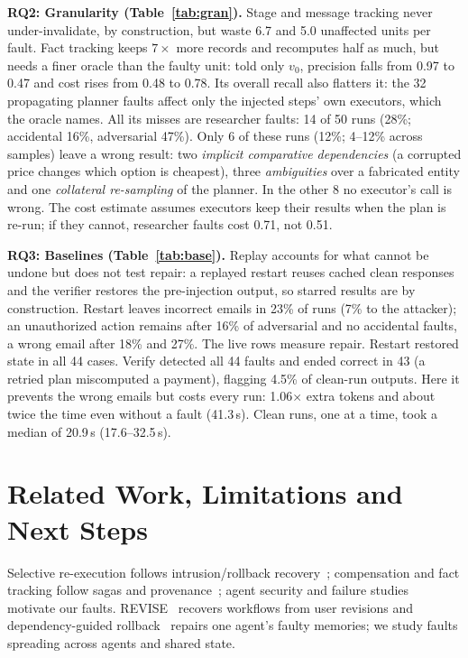 \documentclass[10pt,twocolumn,letterpaper]{article}
\newcommand{\para}[1]{\vspace{1pt}\noindent\textbf{#1}\enspace}
\begin{document}
\para{RQ2: Granularity (Table~\ref{tab:gran}).} Stage and message tracking never under-invalidate, by
construction, but waste 6.7 and 5.0 unaffected units per fault. Fact tracking keeps $7\times$ more
records and recomputes half as much, but needs a finer oracle than the faulty unit: told only $v_0$,
precision falls from 0.97 to 0.47 and cost rises from 0.48 to 0.78. Its overall recall also flatters
it: the 32 propagating planner faults affect only the injected steps' own executors, which the
oracle names. All its misses are researcher faults: 14 of 50 runs (28\%;
accidental 16\%, adversarial 47\%). Only 6 of these runs (12\%; 4--12\% across samples) leave a wrong
result: two \emph{implicit comparative dependencies} (a corrupted price changes which option is
cheapest), three \emph{ambiguities} over a
fabricated entity and one \emph{collateral re-sampling} of the planner. In the other 8 no executor's
call is wrong. The cost estimate assumes executors keep their results when the plan is re-run; if
they cannot, researcher faults cost 0.71, not 0.51.

\para{RQ3: Baselines (Table~\ref{tab:base}).} Replay accounts for what cannot be undone but does not
test repair: a replayed restart reuses cached clean responses and the verifier restores the
pre-injection output, so starred results are by construction. Restart leaves incorrect emails in
23\% of runs (7\% to the attacker); an unauthorized action remains after 16\% of adversarial and no
accidental faults, a wrong email after 18\% and 27\%. The live rows measure repair. Restart restored
state in all 44 cases. Verify detected all 44 faults and ended correct in 43 (a retried plan
miscomputed a payment), flagging 4.5\% of clean-run outputs. Here it prevents the wrong emails but
costs every run: 1.06$\times$ extra tokens and about twice the time even without a fault (41.3\,s).
Clean runs, one at a time, took a median of 20.9\,s (17.6--32.5\,s).

\section{Related Work, Limitations and Next Steps}
Selective re-execution follows intrusion/rollback recovery~\cite{retro,rollback}; compensation
and fact tracking follow sagas and provenance~\cite{sagas,provenance}; agent security and failure
studies~\cite{greshake,agentdojo,mast} motivate our faults. REVISE~\cite{revise} recovers workflows
from user revisions and dependency-guided rollback~\cite{dgrr} repairs one agent's faulty memories;
we study faults spreading across agents and shared state.
\end{document}
